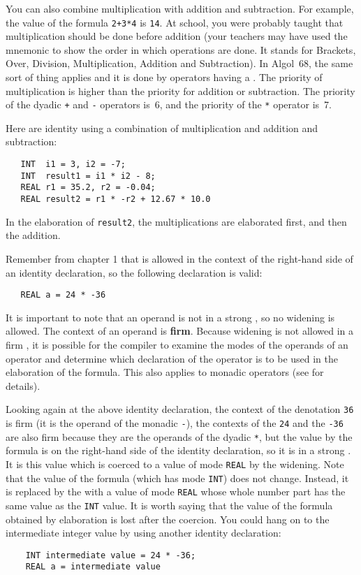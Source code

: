 You can also combine multiplication with addition and subtraction.
For example, the value of the formula \verb|2+3*4| is \verb|14|.
At school, you were probably taught that multiplication should be
done before addition (your teachers may have used the mnemonic
 to show the order in which operations are done.  It
stands for Brackets, Over, Division, Multiplication, Addition and
Subtraction).  In Algol~68, the same sort of thing applies and it is
done by operators having a .  The priority of
multiplication is higher than the priority for addition or
subtraction.  The priority of the dyadic \verb|+| and \verb|-|
operators is~6, and the priority of the \verb|*| operator is~7.

Here are identity  using a
combination of multiplication and addition and subtraction:
\begin{verbatim}
   INT  i1 = 3, i2 = -7;
   INT  result1 = i1 * i2 - 8;
   REAL r1 = 35.2, r2 = -0.04;
   REAL result2 = r1 * -r2 + 12.67 * 10.0
\end{verbatim}
\noindent
In the elaboration of \verb|result2|, the multiplications are
elaborated first, and then the addition.

Remember from chapter 1 that  is
allowed in the context of the right-hand side of an identity
declaration, so the following declaration is valid:
\begin{verbatim}
   REAL a = 24 * -36
\end{verbatim}
\noindent
It is important to note that an operand is not in a strong
, so no widening is allowed. The
context of an operand is \textbf{firm}.  Because widening is not
allowed in a firm , it is possible for
the compiler to examine the modes of the operands of an operator and
determine which declaration of the operator is to be used in the
elaboration of the formula. This also applies to monadic operators
(see  for details).

Looking again at the above identity declaration, the context of the
denotation \verb|36| is firm (it is the operand of the monadic
\verb|-|), the contexts of the \verb|24| and the \verb|-36| are also
firm because they are the operands of the dyadic \verb|*|, but the
value  by the formula is on the
right-hand side of the identity declaration, so it is in a strong
.  It is this value which is coerced
to a value of mode \verb|REAL| by the widening.  Note that the value
of the formula (which has mode \verb|INT|) does not change.  Instead,
it is replaced by the  with a value of mode \verb|REAL|
whose whole number part has the same value as the \verb|INT| value.
It is worth saying that the value of the formula obtained by
elaboration is lost after the coercion. You could hang on to the
intermediate integer value by using another identity declaration:
\begin{verbatim}
    INT intermediate value = 24 * -36;
    REAL a = intermediate value
\end{verbatim}

